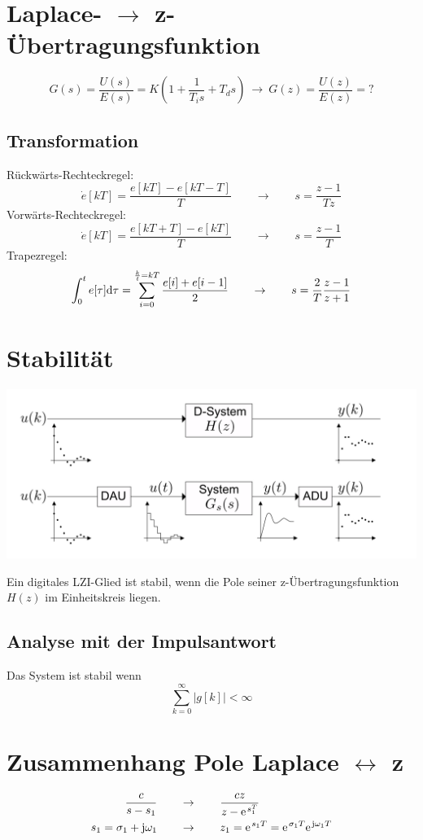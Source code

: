\section{Laplace- $\rightarrow$ z-Übertragungsfunktion}
\[
	G(s) = \frac{U(s)}{E(s)} = K \left( 1 + \frac{1}{T_is}+T_ds\right) \ \rightarrow \ G(z) =  \frac{U(z)}{E(z)} = ?
\]

\subsection{Transformation}
Rückwärts-Rechteckregel:
\[
	\dot{e}[kT] = \frac{e[kT]-e[kT-T]}{T} \qquad \rightarrow \qquad s = \frac{z-1}{Tz}
\]
Vorwärts-Rechteckregel:
\[
	\dot{e}[kT] = \frac{e[kT+T]-e[kT]}{T} \qquad \rightarrow \qquad  s = \frac{z-1}{T}
\]
Trapezregel:
\[
	\int_{0}^{t}e[\tau]\mathrm{d}\tau = \sum_{i=0}^{\frac{k}{t}=kT}\frac{e[i]+e[i-1]}{2} \qquad \rightarrow \qquad s = \frac{2}{T} \frac{z-1}{z+1}
\]

\section{Stabilität}
\begin{center}
	\includegraphics[width=.8\textwidth]{./images/stabilitat}
\end{center}
Ein digitales LZI-Glied ist stabil, wenn die Pole seiner z-Übertragungsfunktion $H(z)$ im Einheitskreis liegen.

\subsection{Analyse mit der Impulsantwort}
Das System ist stabil wenn
\[ \sum_{k=0}^{\infty}|g[k]|<\infty \]

\section{Zusammenhang Pole Laplace $\leftrightarrow$ z}
\[\begin{aligned}
	\frac{c}{s-s_1} \qquad &\rightarrow \qquad \frac{cz}{z-\e^{s_1^T}} \\
	s_1 = \sigma_1 + \im\omega_1 \qquad &\rightarrow \qquad  z_1=\e^{s_1T} = \e^{\sigma_1T}\e^{\im\omega_1T}
\end{aligned}\]

